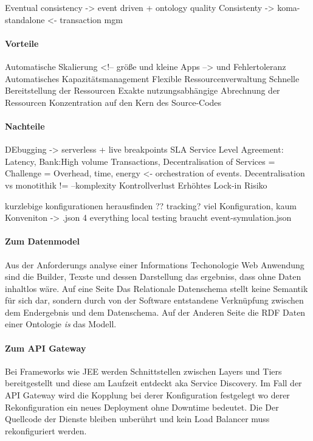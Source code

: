 \documentclass[
12pt,
english,
ngerman,
headsepline,
twoside,
openright,
numbers=noenddot,version=first
]{scrreprt}
\begin{document}
Eventual consistency -> event driven + ontology quality
Consistenty -> koma-standalone <- transaction mgm

\paragraph{Vorteile}
Automatische Skalierung <!-- größe und kleine Apps --> und Fehlertoleranz
Automatisches Kapazitätsmanagement
Flexible Ressourcenverwaltung
Schnelle Bereitstellung der Ressourcen
Exakte nutzungsabhängige Abrechnung der Ressourcen
Konzentration auf den Kern des Source-Codes


\paragraph{Nachteile}

DEbugging -> serverless + live breakpoints 
SLA Service Level Agreement: Latency, Bank:High volume Transactions,
Decentralisation of Services = Challenge = Overhead, time, energy <- orchestration of events.
Decentralisation vs monotithik != --komplexity
Kontrollverlust
Erhöhtes Lock-in Risiko

kurzlebige konfigurationen herausfinden ?? tracking?
viel Konfiguration, kaum Konveniton -> .json 4 everything
local testing braucht event-symulation.json



\paragraph{Zum Datenmodel}
Aus der Anforderungs analyse einer Informations Techonologie Web Anwendung sind die Builder, Texste und dessen Darstellung das ergebniss, dass ohne Daten inhaltlos wäre. Auf eine Seite Das Relationale Datenschema stellt keine Semantik für sich dar, sondern durch von der Software entstandene Verknüpfung zwischen dem Endergebnis und dem Datenschema. Auf der Anderen Seite die  RDF Daten einer Ontologie \textit{is} das Modell.

\paragraph{Zum API Gateway}
Bei Frameworks wie JEE werden Schnittstellen zwischen Layers und Tiers bereitgestellt und diese am Laufzeit entdeckt aka Service Discovery. 
Im Fall der API Gateway wird die Kopplung bei derer Konfiguration festgelegt wo derer Rekonfiguration ein neues Deployment ohne Downtime bedeutet. Die Der Quellcode der Dienste bleiben unberührt und kein Load Balancer muss rekonfiguriert werden. 
\end{document}
